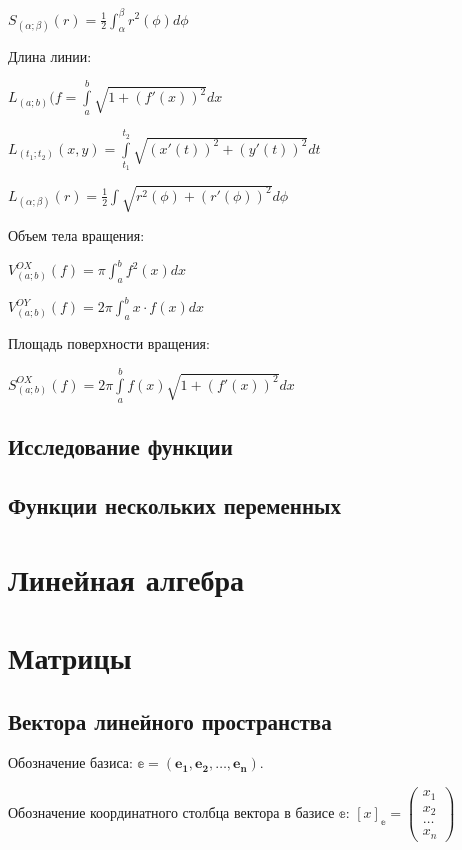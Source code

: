 $ S_{(\alpha; \beta)}(r) = \frac{1}{2} \int_\alpha^\beta r^2(\phi) d\phi $

Длина линии:

$ L_{(a;b)}(f = \int\limits_a^b \sqrt{1+(f'(x))^2} dx $

$ L_{(t_1; t_2)}(x, y) = \int\limits_{t_1}^{t_2} \sqrt{(x'(t))^2+(y'(t))^2} dt $

$ L_{(\alpha; \beta)}(r) = \frac{1}{2} \int \sqrt{r^2(\phi) + (r'(\phi))^2} d\phi $

Объем тела вращения:

$ V^{OX}_{(a; b)}(f) = \pi \int_a^b f^2(x) dx $

$ V^{OY}_{(a; b)}(f) = 2\pi \int_a^b x\cdot f(x) dx $

Площадь поверхности вращения:

$ S^{OX}_{(a;b)}(f) = 2\pi \int\limits_a^b f(x)\sqrt{1+(f'(x))^2} dx $

\subsection{Исследование функции}

\subsection{Функции нескольких переменных}


\section{Линейная алгебра}

\section{Матрицы}

\subsection{Вектора линейного пространства}

Обозначение базиса: $\mathbb{e} = (\boldsymbol{e_1}, \boldsymbol{e_2}, \dots, \boldsymbol{e_n})$.

Обозначение координатного столбца вектора в базисе $\mathbb{e}$: $[x]_\mathbb{e} = 
\begin{pmatrix}
	x_1\\
	x_2\\
	\dots\\
	x_n
\end{pmatrix} $  

